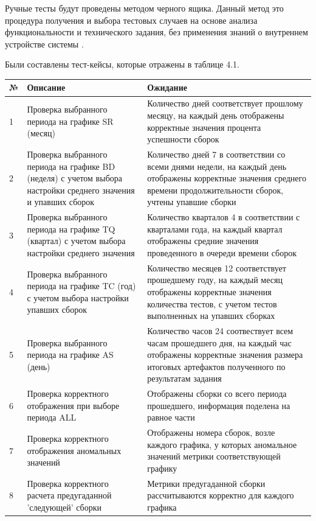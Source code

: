 Ручные тесты будут проведены методом черного ящика. Данный метод это процедура получения и выбора тестовых случаев на основе анализа функциональности и технического задания, без применения знаний о внутреннем устройстве системы \cite{blacktest}.

Были составлены тест-кейсы, которые отражены в таблице 4.1.

\begin{table}
    \centering
    \begin{tabular}{|p{1cm}|p{5cm}|p{9cm}|}
    \hline
        № & Описание & Ожидание  \\ \hline
        1 & Проверка выбранного периода на графике SR (месяц) & Количество  дней соответствует прошлому месяцу, на каждый день отображены корректные значения процента успешности сборок\\ \hline
        2 & Проверка выбранного периода на графике BD (неделя) с учетом выбора настройки среднего значения и  упавших сборок& Количество  дней 7 в соответствии со всеми днями недели, на каждый день отображены корректные значения среднего времени продолжительности сборок, учтены упавшие сборки \\ \hline
        3 & Проверка выбранного периода на графике TQ (квартал) с учетом выбора настройки среднего значения & Количество  кварталов 4 в соответствии с кварталами года, на каждый квартал отображены средние значения проведенного в очереди времени сборок  \\ \hline
        4 & Проверка выбранного периода на графике TC (год) с учетом выбора настройки упавших сборок & Количество  месяцев 12 соответствует прошедшему году, на каждый месяц отображены корректные значения  количества тестов, с учетом тестов выполненных на упавших сборках \\ \hline
        5 & Проверка выбранного периода на графике AS (день) & Количество  часов 24 соотвествует всем часам прошедшего дня, на каждый час отображены корректные значения размера итоговых артефактов полученного по результатам задания   \\ \hline
        6 & Проверка корректного отображения при выборе периода ALL & Отображены сборки со всего периода прошедшего, информация поделена на равное части   \\ \hline
        7 & Проверка корректного отображения аномальных значений & Отображены номера сборок, возле каждого графика, у которых аномальное значений метрики соответствующей графику   \\ \hline
        8 & Проверка корректного расчета предугаданной 'следующей' сборки& Метрики предугаданной сборки рассчитываются корректно для каждого графика   \\ \hline

    \end{tabular}
\end{table}

